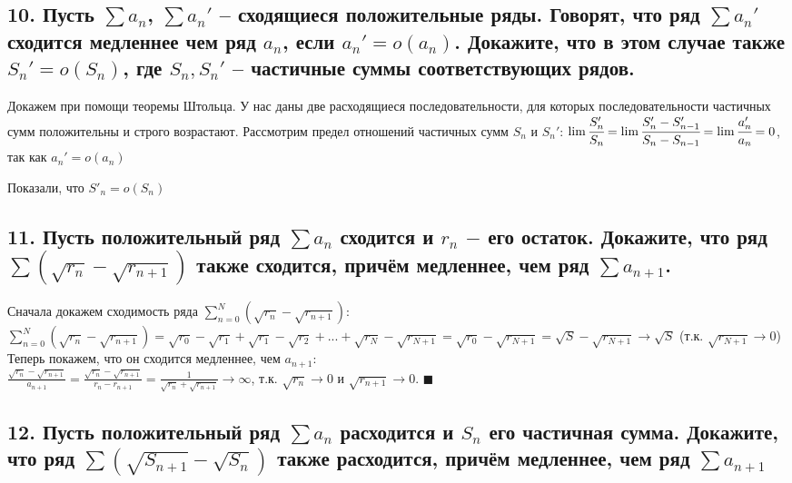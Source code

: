 \documentclass[a4paper, fleqn]{article}
\begin{document}
        \subsection*{10. Пусть $\sum a_n$, $\sum a_n'$ -- сходящиеся положительные ряды. Говорят, что ряд $\sum a_n'$ сходится медленнее чем ряд $a_n$, если $a_n'=o(a_n)$. Докажите, что в этом случае также $S_n'=o(S_n)$, где $S_n,  S_n'$ -- частичные суммы соответствующих рядов.}
        Докажем при помощи теоремы Штольца. У нас даны две расходящиеся последовательности, для которых последовательности частичных сумм положительны и строго возрастают. Рассмотрим предел отношений частичных сумм $S_n$ и $S_n'$:
        $\lim \cfrac{S_n'}{S_n}=\lim \cfrac{S_n'-S'_{n-1}}{S_n-S_{n-1}}=\lim \cfrac{a_n'}{a_n}=
        0$, так как $a_n'=o(a_n)$
        
        Показали, что $S'_n=o(S_n)$
    \subsection*{11. Пусть положительный ряд $\sum a_n$ сходится и $r_n$ $-$ его остаток. Докажите, что ряд $\sum(\sqrt{r_n} - \sqrt{r_{n + 1}})$ также сходится, причём медленнее, чем ряд $\sum a_{n + 1}$.}
    Сначала докажем сходимость ряда $\sum\limits_{n = 0}^N (\sqrt{r_n} - \sqrt{r_{n + 1}})$:\\
    $\sum\limits_{n = 0}^N (\sqrt{r_n} - \sqrt{r_{n + 1}}) = \sqrt{r_0} - \sqrt{r_1} + \sqrt{r_1} - \sqrt{r_2} + ... + \sqrt{r_N} - \sqrt{r_{N+1}} = \sqrt{r_0} - \sqrt{r_{N+1}} = \sqrt{S} - \sqrt{r_{N+1}} \rightarrow \sqrt{S}$ (т.к. $\sqrt{r_{N+1}} \rightarrow 0$) \\
    Теперь покажем, что он сходится медленнее, чем $a_{n+1}$: \\
    $\frac{\sqrt{r_n} - \sqrt{r_{n + 1}}}{a_{n+1}} = \frac{\sqrt{r_n} - \sqrt{r_{n + 1}}}{r_n - r_{n+1}} = \frac{1}{\sqrt{r_n} + \sqrt{r_{n + 1}}} \rightarrow \infty$, т.к. $\sqrt{r_n} \rightarrow 0$ и $\sqrt{r_{n + 1}} \rightarrow 0$. $\blacksquare$ \\
    
        \subsection*{12. Пусть положительный ряд $\sum a_n$ расходится и $S_n$ его частичная сумма. Докажите, что ряд $\sum (\sqrt{S_{n+1}} - \sqrt{S_n})$ также расходится, причём медленнее, чем ряд $\sum a_{n+1}$}
\end{document}
